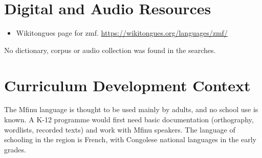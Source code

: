 \documentclass[12pt]{article}
\begin{document}
\section{Digital and Audio Resources}
\begin{itemize}
\item Wikitongues page for zmf. \url{https://wikitongues.org/languages/zmf/}
\end{itemize}
No dictionary, corpus or audio collection was found in the searches.

\section{Curriculum Development Context}
The Mfinu language is thought to be used mainly by adults, and no school use is known. A K-12 programme would first need basic documentation (orthography, wordlists, recorded texts) and work with Mfinu speakers. The language of schooling in the region is French, with Congolese national languages in the early grades.
\end{document}

